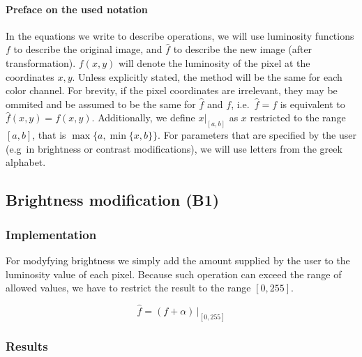 \documentclass[12pt]{article}
\theoremstyle{definition}
\begin{document}
\paragraph*{Preface on the used notation}
In the equations we write to describe operations, we will use luminosity functions $f$ to describe the original image, and $\hat{f}$ to describe the new image (after transformation).
$f(x,y)$ will denote the luminosity of the pixel at the coordinates $x,y$. Unless explicitly stated, the method will be the same for each color channel.
For brevity, if the pixel coordinates are irrelevant, they may be ommited and be assumed to be the same for $\hat{f}$ and $f$, i.e.\ $\hat{f}=f$ is equivalent to $\hat{f}(x,y) = f(x,y)$.
Additionally, we define $x|_{[a,b]}$ as $x$ restricted to the range $[a,b]$, that is $\max\{a, \min\{x,b\}\}$.
For parameters that are specified by the user (e.g\ in brightness or contrast modifications), we will use letters from the greek alphabet.

\subsection{Brightness modification (B1)}

\subsubsection{Implementation}

For modyfying brightness we simply add the amount supplied by the user to the luminosity value of each pixel.
Because such operation can exceed the range of allowed values, we have to restrict the result to the range $[0,255]$.

\begin{equation}
    \hat{f} = (f + \alpha) \, \Big|_{[0,255]}
\end{equation}

\subsubsection{Results}
\end{document}
